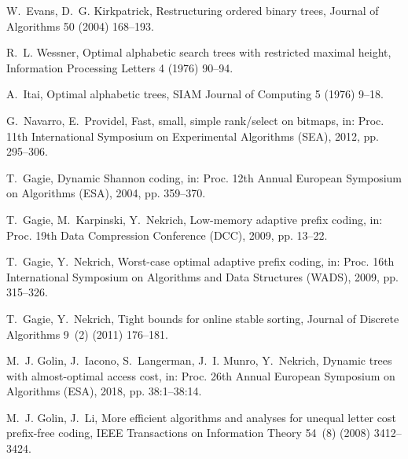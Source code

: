 \documentclass[preprint,12pt]{elsarticle}
\begin{document}
\begin{thebibliography}{10}
W.~Evans, D.~G. Kirkpatrick, Restructuring ordered binary trees, Journal of
  Algorithms 50 (2004) 168--193.

R.~L. Wessner, Optimal alphabetic search trees with restricted maximal height,
  Information Processing Letters 4 (1976) 90--94.

A.~Itai, Optimal alphabetic trees, {SIAM} Journal of Computing 5 (1976) 9--18.

G.~Navarro, E.~Providel, Fast, small, simple rank/select on bitmaps, in: Proc.
  11th International Symposium on Experimental Algorithms (SEA), 2012, pp.
  295--306.

T.~Gagie, Dynamic {Shannon} coding, in: Proc. 12th Annual European Symposium on
  Algorithms (ESA), 2004, pp. 359--370.

T.~Gagie, M.~Karpinski, Y.~Nekrich, Low-memory adaptive prefix coding, in:
  Proc. 19th Data Compression Conference (DCC), 2009, pp. 13--22.

T.~Gagie, Y.~Nekrich, Worst-case optimal adaptive prefix coding, in: Proc. 16th
  International Symposium on Algorithms and Data Structures (WADS), 2009, pp.
  315--326.

T.~Gagie, Y.~Nekrich, Tight bounds for online stable sorting, Journal of
  Discrete Algorithms 9~(2) (2011) 176--181.

M.~J. Golin, J.~Iacono, S.~Langerman, J.~I. Munro, Y.~Nekrich, Dynamic trees
  with almost-optimal access cost, in: Proc. 26th Annual European Symposium on
  Algorithms (ESA), 2018, pp. 38:1--38:14.

M.~J. Golin, J.~Li, More efficient algorithms and analyses for unequal letter
  cost prefix-free coding, {IEEE} Transactions on Information Theory 54~(8)
  (2008) 3412--3424.

\end{thebibliography}
\end{document}
